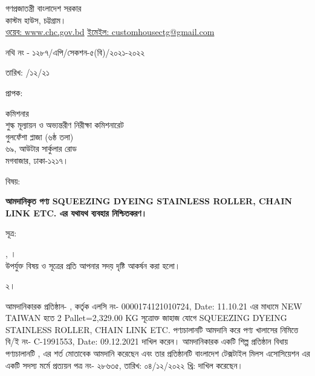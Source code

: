 \documentclass[12pt]{article}
\newcommand{\fileno}{নথি নং - ১২৮৭/এপি/সেকশন-৫(বি)/২০২১-২০২২}
\newcommand{\fdt}{\hspace*{3em} তারিখ: \hspace{2.4em} /১২/২১}
\newcommand{\good}{SQUEEZING DYEING STAINLESS ROLLER, CHAIN LINK ETC.}
\newcommand{\pkg}{2 Pallet=2,329.00 KG}
\newcommand{\co}{NEW TAIWAN}
\newcommand{\beno}{C-1991553}
\newcommand{\bedt}{09.12.2021}
\newcommand{\lcno}{0000174121010724}
\newcommand{\lcdt}{11.10.21}
\newcommand{\impn}{\jdwl}
\newcommand{\impadd}{\jdwla}
\newcommand{\btmaltno}{প্রত্যয়ন পত্র নং- ২৮৬৩৫}
\newcommand{\btmaltnodt}{তারিখ:  ০৪/১২/২০২২ খ্রি:}
\begin{document}
\newpage
\begin{center}
\vspace*{6MM}
গণপ্রজাতন্ত্রী বাংলাদেশ সরকার
\\
\footnotesize{কাস্টম হাউস, চট্টগ্রাম।}
\\
\href{}{ওয়েব: www.chc.gov.bd}\hspace{1em}
\href{}{ইমেইল: customhousectg@gmail.com}
\end{center}
\normalsize
\begin{minipage}[t]{.74\linewidth}
{\fileno}
\end{minipage}
\begin{minipage}[t]{.26\linewidth}
{\fdt}
\\
\end{minipage}
\begin{minipage}[t]{.07\linewidth}
প্রাপক:
\end{minipage}
\begin{minipage}[t]{.93\linewidth}
কমিশনার
\\
শুল্ক মূল্যায়ন ও অভ্যন্তরীণ নিরীক্ষা কমিশনারেট
\\
গুলফেঁশা প্লাজা (৬ষ্ঠ তলা)
\\
৬৯, আউটার সার্কুলার রোড
\\
মগবাজার, ঢাকা-১২১৭।
\\
\end{minipage}
\begin{minipage}[t]{.07\linewidth}
বিষয়:
\end{minipage}
\begin{minipage}[t]{.93\linewidth}
\textbf{আমদানিকৃত পণ্য {\good} এর যথাযথ ব্যবহার নিশ্চিতকরণ।}
\end{minipage}
\begin{minipage}[t]{.07\linewidth}
সূত্র:
\end{minipage}
\begin{minipage}[t]{.93\linewidth}
{\srooot}, {\sroootd}।
\\
উপর্যুক্ত বিষয় ও সূত্রের প্রতি আপনার সদয় দৃষ্টি
আকর্ষন করা হলো।
\\
\end{minipage}
\begin{minipage}[t]{.07\linewidth}
২।
\end{minipage}
\begin{minipage}[t]{.93\linewidth}
আমদানিকারক প্রতিষ্ঠান- {\impn}, {\impadd}
কর্তৃক এলসি নং- {\lcno}, Date: {\lcdt}
এর মাধ্যমে {\co} হতে
{\pkg} সূত্রোক্ত জাহাজ যোগে {\good}
পণ্যচালানটি আমদানি করে পণ্য
খালাসের নিমিত্তে বি/ই নং- {\beno}, Date: {\bedt}
দাখিল করেন। আমদানিকারক একটি
শিল্প প্রতিষ্ঠান বিধায় পণ্যচালানটি
{\srooot}, {\sroootd}
এর শর্ত মোতাবেক আমদানি করেছেন এবং
তার প্রতিষ্ঠানটি বাংলাদেশ টেক্সটাইল মিলস
এসোসিয়েশন এর একটি সদস্য মর্মে
{\btmaltno}, {\btmaltnodt}
দাখিল করেছেন।
\\
\end{minipage}
\end{document}
